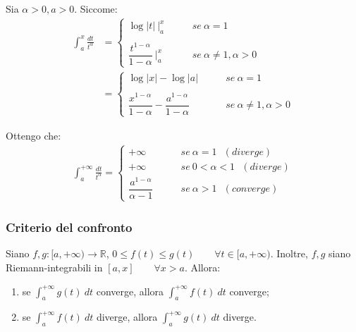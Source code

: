 \documentclass{article}
\begin{document}
\noindent Sia $\alpha > 0, a > 0$. Siccome:
\begin{align*}
    \int_a^x \frac{dt}{t^\alpha} &= \begin{cases}
        \log|t| \ \bigg|_a^x & \qquad se \ \alpha = 1\\ \\
        \dfrac{t^{1 - \alpha}}{1 - \alpha} \ \bigg|_a^x & \qquad se \ \alpha \neq 1, \alpha > 0
    \end{cases} \\ 
    &=
    \begin{cases}
        \log|x| - \log|a| & \qquad se \ \alpha = 1 \\ \\
        \dfrac{x^{1 - \alpha}}{1 - \alpha} - \dfrac{a^{1 - \alpha}}{1 - \alpha} & \qquad se \ \alpha \neq 1, \alpha > 0
    \end{cases}
\end{align*}

\noindent Ottengo che:
\begin{align*}
    \int_a^{+\infty} \frac{dt}{t^\alpha} = \begin{cases}
        + \infty & \qquad se \ \alpha = 1 \ \ \ (diverge) \\
        +\infty & \qquad se \ 0 < \alpha < 1 \ \ \ (diverge) \\
        \dfrac{a^{1 - \alpha}}{\alpha - 1} & \qquad se \ \alpha > 1 \ \ \ (converge)
    \end{cases}
\end{align*}

\subsubsection{Criterio del confronto}
Siano $f, g: [a, +\infty) \xrightarrow{} \mathbb{R}$, $0 \leq f(t) \leq g(t) \qquad \forall t \in [a, +\infty)$. Inoltre, $f, g$ siano Riemann-integrabili in $[a, x] \qquad \forall x > a$. Allora:
\begin{enumerate}
    \item se $\int_a^{+\infty} g(t) \ dt$ converge, allora $\int_a^{+\infty} f(t) \ dt$ converge;
    \item se $\int_a^{+\infty} f(t) \ dt$ diverge, allora $\int_a^{+\infty} g(t) \ dt$ diverge.
\end{enumerate}
\end{document}
